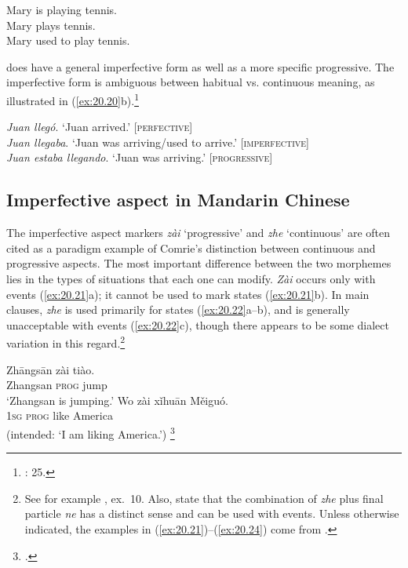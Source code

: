 \ea \label{ex:20.19}
\ea  Mary is playing tennis.\\
\ex Mary plays tennis.\\
\ex Mary used to play tennis.
                       \z
\z


 does have a general imperfective form as well as a more specific progressive. The imperfective form is ambiguous between habitual vs. continuous meaning, as illustrated in (\ref{ex:20.20}b).\footnote{\citealt{Comrie1976}: 25.}


\ea \label{ex:20.20}
\ea  \textit{Juan llegó}.  ‘Juan arrived.’ \hfill  [\textsc{perfective}]\\
\ex \textit{Juan llegaba}.  ‘Juan was arriving/used to arrive.’ \hfill  [\textsc{imperfective}]\\
\ex \textit{Juan estaba llegando}.  ‘Juan was arriving.’ \hfill  [\textsc{progressive}]
                       \z
\z

\subsection{Imperfective aspect in Mandarin Chinese}\label{sec:20.4.2}

The  imperfective aspect markers \textit{zài} ‘progressive’ and \textit{zhe} ‘continuous’ are often cited as a paradigm example of Comrie’s distinction between continuous and progressive aspects. The most important difference between the two morphemes lies in the types of situations that each one can modify. \textit{Zài} occurs only with events (\ref{ex:20.21}a); it cannot be used to mark states (\ref{ex:20.21}b). In main clauses, \textit{zhe} is used primarily for states (\ref{ex:20.22}a--b), and is generally unacceptable with events (\ref{ex:20.22}c), though there appears to be some dialect variation in this regard.\footnote{See for example \citet[738]{KleinEtAl2000}, ex.~10. Also, \citet{LiThompson1981} state that the combination of \textit{zhe} plus final particle \textit{ne} has a distinct sense and can be used with events. Unless otherwise indicated, the examples in (\ref{ex:20.21})--(\ref{ex:20.24}) come from \citet[220--222]{LiThompson1981}.}

\ea \label{ex:20.21}
\ea  \gll  Zhāngsān  zài  tiào.\\
Zhangsan  \textsc{prog}  jump\\
\glt ‘Zhangsan is jumping.’ 
\ex \gll  *Wo  zài  xǐhuān  Měiguó.\\
  \textsc{1sg}  \textsc{prog}  like  America\\
\glt (intended: ‘I am liking America.’)  \footnote{\citet[90]{Sun2011}.}
\z \z

